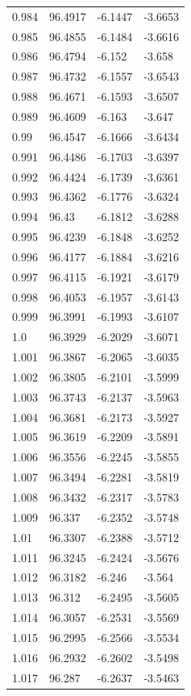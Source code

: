 \begin{tabular}{llll}
0.984 & 96.4917 & -6.1447 & -3.6653 \\
0.985 & 96.4855 & -6.1484 & -3.6616 \\
0.986 & 96.4794 & -6.152 & -3.658 \\
0.987 & 96.4732 & -6.1557 & -3.6543 \\
0.988 & 96.4671 & -6.1593 & -3.6507 \\
0.989 & 96.4609 & -6.163 & -3.647 \\
0.99 & 96.4547 & -6.1666 & -3.6434 \\
0.991 & 96.4486 & -6.1703 & -3.6397 \\
0.992 & 96.4424 & -6.1739 & -3.6361 \\
0.993 & 96.4362 & -6.1776 & -3.6324 \\
0.994 & 96.43 & -6.1812 & -3.6288 \\
0.995 & 96.4239 & -6.1848 & -3.6252 \\
0.996 & 96.4177 & -6.1884 & -3.6216 \\
0.997 & 96.4115 & -6.1921 & -3.6179 \\
0.998 & 96.4053 & -6.1957 & -3.6143 \\
0.999 & 96.3991 & -6.1993 & -3.6107 \\
1.0 & 96.3929 & -6.2029 & -3.6071 \\
1.001 & 96.3867 & -6.2065 & -3.6035 \\
1.002 & 96.3805 & -6.2101 & -3.5999 \\
1.003 & 96.3743 & -6.2137 & -3.5963 \\
1.004 & 96.3681 & -6.2173 & -3.5927 \\
1.005 & 96.3619 & -6.2209 & -3.5891 \\
1.006 & 96.3556 & -6.2245 & -3.5855 \\
1.007 & 96.3494 & -6.2281 & -3.5819 \\
1.008 & 96.3432 & -6.2317 & -3.5783 \\
1.009 & 96.337 & -6.2352 & -3.5748 \\
1.01 & 96.3307 & -6.2388 & -3.5712 \\
1.011 & 96.3245 & -6.2424 & -3.5676 \\
1.012 & 96.3182 & -6.246 & -3.564 \\
1.013 & 96.312 & -6.2495 & -3.5605 \\
1.014 & 96.3057 & -6.2531 & -3.5569 \\
1.015 & 96.2995 & -6.2566 & -3.5534 \\
1.016 & 96.2932 & -6.2602 & -3.5498 \\
1.017 & 96.287 & -6.2637 & -3.5463 \\

\end{tabular}

